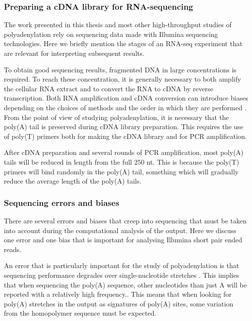 \subsubsection{Preparing a cDNA library for RNA-sequencing}
The work presented in this thesis and most other high-throughput studies of
polyadenylation rely on sequencing data made with Illumina sequencing
technologies. Here we briefly mention the stages of an RNA-seq
experiment that are relevant for interpreting subsequent results.

To obtain good sequencing results, fragmented DNA in large concentrations is
required. To reach these concentration, it is generally necessary to both
amplify the cellular RNA extract and to convert the RNA to cDNA by reverse
transcription. Both RNA amplification and cDNA conversion can introduce biases
depending on the choices of methods and the order in which they are performed
\cite{wang_rna-seq:_2009}. From the point of view of studying polyadenylation,
it is necessary that the poly(A) tail is preserved during cDNA library
preparation. This requires the use of poly(T) primers both for making the cDNA
library and for PCR amplification.

After cDNA preparation and several rounds of PCR amplification, most poly(A)
tails will be reduced in length from the full 250 nt. This is because the
poly(T) primers will bind randomly in the poly(A) tail, something which will
gradually reduce the average length of the poly(A) tails.

\subsubsection{Sequencing errors and biases}
There are several errors and biases that creep into sequencing that must be
taken into account during the computational analysis of the output. Here we
discuss one error and one bias that is important for analysing Illumina short
pair ended reads.

An error that is particularly important for the study of polyadenylation is
that sequencing performance degrades over single-nucleotide stretches
\cite{minoche_evaluation_2011}. This implies that when sequencing the poly(A)
sequence, other nucleotides than just A will be reported with a relatively high
frequency.. This means that when looking for poly(A) stretches in the output as
signatures of poly(A) sites, some variation from the homopolymer sequence must
be expected.

